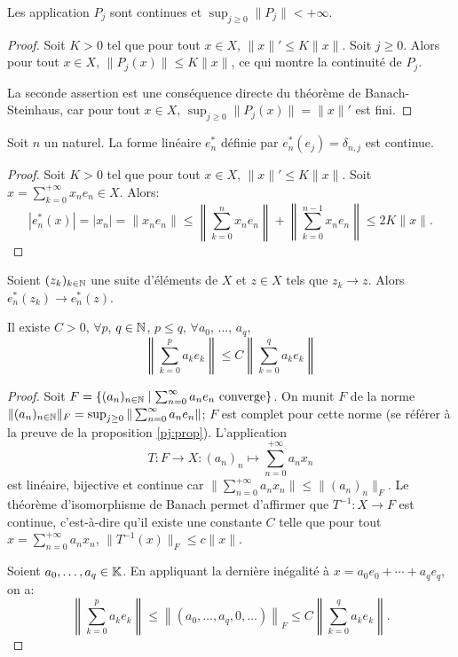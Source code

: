 \begin{cor}
  Les application $P_j$ sont continues et $\sup_{j\geq 0}\|P_j\| < +\infty$.
\end{cor}
\begin{proof}
  Soit $K > 0$ tel que pour tout $x\in X$, $\|x\|'\leq K\|x\|$.
  Soit $j\geq 0$. Alors pour tout $x\in X$, $\|P_j(x)\|\leq K\|x\|$, ce qui
  montre la continuité de $P_j$.

  La seconde assertion est une conséquence directe du théorème de
  Banach-Steinhaus, car pour tout $x\in X$, $\sup_{j\geq 0}\|P_j(x)\|=\|x\|'$
  est fini.
\end{proof}
\begin{prop}
  Soit $n$ un naturel. La forme linéaire $e^*_n$ définie par
  $e^*_n(e_j) = \delta_{n, j}$ est continue.
\end{prop}
\begin{proof}
  Soit $K > 0$ tel que pour tout $x\in X$, $\|x\|'\leq K\|x\|$.
  Soit $x=\sum_{k=0}^{+\infty}x_ne_n\in X$. Alors:
  $$|e^*_n(x)| = |x_n| = \|x_ne_n\| \leq \left\|\sum_{k=0}^{n}x_ne_n\right\|
  + \left\|\sum_{k=0}^{n-1}x_ne_n\right\|\leq 2K\|x\|.$$
\end{proof}
\begin{cor}
  Soient $(z_k)_{k\in\mathbb{N}}$ une suite d'éléments de $X$ et $z\in X$ tels que
  $z_k\to z$. Alors $e^*_n(z_k)\to e^*_n(z)$.
\end{cor}

\begin{prop}
  Il existe $C > 0$, $\forall p$, $q\in\mathbb{N}$, $p\leq q$,
  $\forall a_0$, $\ldots$, $a_q$,
  $$\left\| \sum_{k=0}^p a_ke_k\right\| \leq
  C \left\| \sum_{k=0}^q a_ke_k\right\|$$
\end{prop}

\begin{proof}
  Soit $F = \{(a_n)_{n\in\mathbb{N}}\mid \sum_{n=0}^\infty a_ne_n \mbox{ converge}\}$.
  On munit $F$ de la norme $\|(a_n)_{n\in\mathbb{N}}\|_F =
  \sup_{j\geq 0}\|\sum_{n=0}^\infty a_ne_n\|$; $F$ est complet pour cette norme
  (se référer à la preuve de la proposition \ref{pj:prop}).
  L'application
  $$T:F\to X: (a_n)_n\mapsto\sum_{n=0}^{+\infty}a_nx_n$$
  est linéaire, bijective et continue car $\|\sum_{n=0}^{+\infty}a_nx_n\|\leq
  \|(a_n)_n\|_F$. Le théorème d'isomorphisme de Banach permet d'affirmer
  que $T^{-1}: X\to F$ est continue, c'est-à-dire qu'il existe une constante
  $C$ telle que pour tout $x= \sum_{n=0}^{+\infty}a_nx_n$, $\|T^{-1}(x)\|_F
  \leq c \|x\|$.

  Soient $a_0, \ldots, a_q\in\mathbb{K}$. En appliquant la dernière inégalité à
  $x = a_0e_0 + \cdots + a_qe_q$, on a:
  $$\left\| \sum_{k=0}^p a_ke_k \right\| \leq
  \left\| (a_0, \ldots, a_q, 0, \ldots) \right\|_F \leq
  C \left\| \sum_{k=0}^q a_ke_k \right\|.$$
\end{proof}
